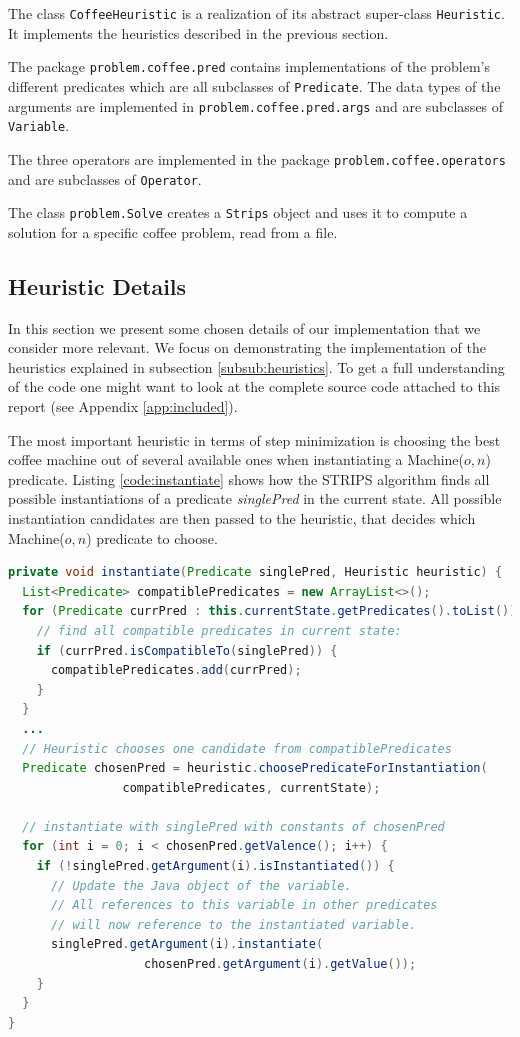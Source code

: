 The class \texttt{CoffeeHeuristic} is a realization of its abstract super-class \texttt{Heuristic}. It implements the heuristics described in the previous section.

The package \texttt{problem.coffee.pred} contains implementations of the problem's different predicates which are all subclasses of \texttt{Predicate}. The data types of the arguments are implemented in \texttt{problem.coffee.pred.args} and are subclasses of \texttt{Variable}.

The three operators are implemented in the package \texttt{problem.coffee.operators} and are subclasses of \texttt{Operator}.

The class \texttt{problem.Solve} creates a \texttt{Strips} object and uses it to compute a solution for a specific coffee problem, read from a file.

\subsection{Heuristic Details}

In this section we present some chosen details of our implementation that we consider more relevant. We focus on demonstrating the implementation of the heuristics explained in subsection \ref{subsub:heuristics}. To get a full understanding of the code one might want to look at the complete source code attached to this report (see Appendix \ref{app:included}).

The most important heuristic in terms of step minimization is choosing the best coffee machine out of several available ones when instantiating a Machine($o, n$) predicate. Listing \ref{code:instantiate} shows how the STRIPS algorithm finds all possible instantiations of a predicate \textit{singlePred} in the current state. All possible instantiation candidates are then passed to the heuristic, that decides which Machine($o, n$) predicate to choose. 

\begin{lstlisting}[language=Java, 
	caption=Strips method  \textit{instantiate}, 
	keywordstyle=\color{blue},
	stringstyle=\color{red},
	commentstyle=\color{magenta},
	label = {code:instantiate}]
private void instantiate(Predicate singlePred, Heuristic heuristic) {
  List<Predicate> compatiblePredicates = new ArrayList<>();
  for (Predicate currPred : this.currentState.getPredicates().toList()) {
    // find all compatible predicates in current state:
    if (currPred.isCompatibleTo(singlePred)) {
      compatiblePredicates.add(currPred);
    }
  }
  ... 
  // Heuristic chooses one candidate from compatiblePredicates
  Predicate chosenPred = heuristic.choosePredicateForInstantiation(
				compatiblePredicates, currentState);
				
  // instantiate with singlePred with constants of chosenPred
  for (int i = 0; i < chosenPred.getValence(); i++) {
    if (!singlePred.getArgument(i).isInstantiated()) {
      // Update the Java object of the variable.
      // All references to this variable in other predicates
      // will now reference to the instantiated variable.
      singlePred.getArgument(i).instantiate(
                   chosenPred.getArgument(i).getValue());
    }
  } 
}
\end{lstlisting}

